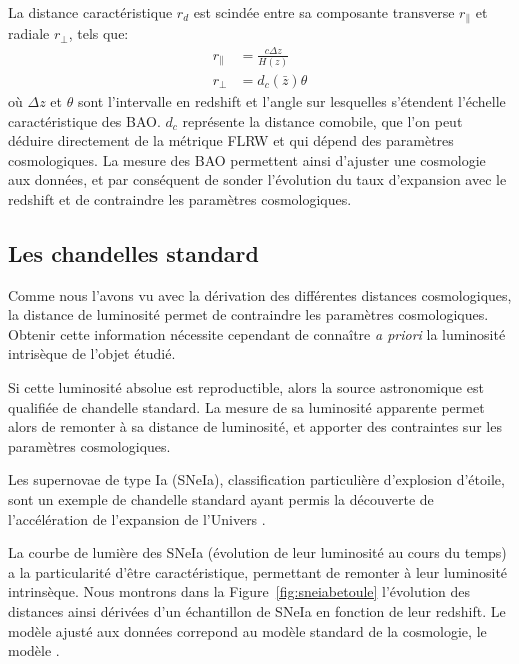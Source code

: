 \documentclass[../main/main.tex]{subfiles}
\begin{document}
La distance caractéristique $r_{d}$ est scindée
entre sa composante transverse $r_{\parallel}$ et radiale $r_{\perp}$,
tels que:
\begin{align}
  \label{eq:bao}
  r_{\parallel}&=\frac{c\Delta z}{H(z)}\\
  r_{\perp}&=d_{c}(\bar{z})\theta
\end{align}
où $\Delta z$ et $\theta$ sont l'intervalle en redshift et
l'angle sur lesquelles s'étendent l'échelle caractéristique des
BAO. $d_{c}$ représente la distance comobile, que l'on peut déduire
directement de la métrique FLRW et qui dépend des paramètres
cosmologiques. La mesure des BAO permettent ainsi d'ajuster une
cosmologie aux données, et par conséquent de sonder l'évolution du taux
d'expansion avec le redshift et de
contraindre les paramètres cosmologiques.

\subsection{Les chandelles standard}

Comme nous l'avons vu avec la dérivation des différentes distances
cosmologiques, la distance de luminosité permet de contraindre les
paramètres cosmologiques. Obtenir cette information nécessite cependant
de connaître \textit{a
  priori} la luminosité intrisèque de l'objet étudié.

Si cette luminosité absolue est reproductible, alors la source
astronomique est qualifiée de chandelle standard. La mesure de sa
luminosité apparente permet alors de remonter à sa distance de luminosité, et apporter des
contraintes sur les paramètres cosmologiques. 

Les supernovae de type Ia (SNeIa), classification particulière d'explosion
d'étoile, sont un exemple de chandelle standard ayant permis la
découverte de l'accélération de l'expansion de l'Univers
\citep{Riess1998, Perlmutter1999}.

La courbe de lumière des SNeIa (évolution de leur luminosité au cours du
temps) a la particularité d'être caractéristique, permettant de remonter à leur luminosité intrinsèque. Nous montrons
dans la Figure~\ref{fig:sneiabetoule} l'évolution des distances ainsi dérivées d'un échantillon de SNeIa en
fonction de leur redshift. Le modèle ajusté aux données correpond au
modèle standard de la cosmologie, le modèle \lcdm.
\end{document}
